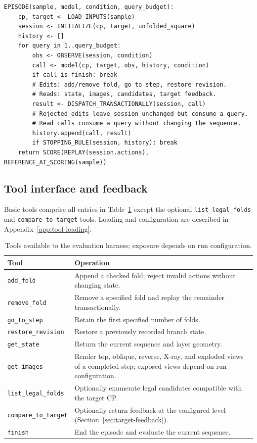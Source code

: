 {\small\begin{verbatim}
EPISODE(sample, model, condition, query_budget):
    cp, target <- LOAD_INPUTS(sample)
    session <- INITIALIZE(cp, target, unfolded_square)
    history <- []
    for query in 1..query_budget:
        obs <- OBSERVE(session, condition)
        call <- model(cp, target, obs, history, condition)
        if call is finish: break
        # Edits: add/remove fold, go to step, restore revision.
        # Reads: state, images, candidates, target feedback.
        result <- DISPATCH_TRANSACTIONALLY(session, call)
        # Rejected edits leave session unchanged but consume a query.
        # Read calls consume a query without changing the sequence.
        history.append(call, result)
        if STOPPING_RULE(session, history): break
    return SCORE(REPLAY(session.actions), REFERENCE_AT_SCORING(sample))
\end{verbatim}
}



\subsection{Tool interface and feedback}
\label{app:tool-interface}
Basic tools comprise all entries in Table~\ref{tab:tools} except the optional
\texttt{list\_legal\_folds} and \texttt{compare\_to\_target} tools.
Loading and configuration are described in Appendix~\ref{app:tool-loading}.

\begin{table}[h]
\centering
\caption{Tools available to the evaluation harness; exposure depends on run configuration.}
\label{tab:tools}
\begin{tabular}{lp{}}
\hline
Tool & Operation \\
\hline
\texttt{add\_fold} & Append a checked fold; reject invalid actions without changing state. \\
\texttt{remove\_fold} & Remove a specified fold and replay the remainder transactionally. \\
\texttt{go\_to\_step} & Retain the first specified number of folds. \\
\texttt{restore\_revision} & Restore a previously recorded branch state. \\
\texttt{get\_state} & Return the current sequence and layer geometry. \\
\texttt{get\_images} & Render top, oblique, reverse, X-ray, and exploded views of a completed step; exposed views depend on run configuration. \\
\texttt{list\_legal\_folds} & Optionally enumerate legal candidates compatible with the target CP. \\
\texttt{compare\_to\_target} & Optionally return feedback at the configured level (Section~\ref{sec:target-feedback}). \\
\texttt{finish} & End the episode and evaluate the current sequence. \\
\hline
\end{tabular}
\end{table}

